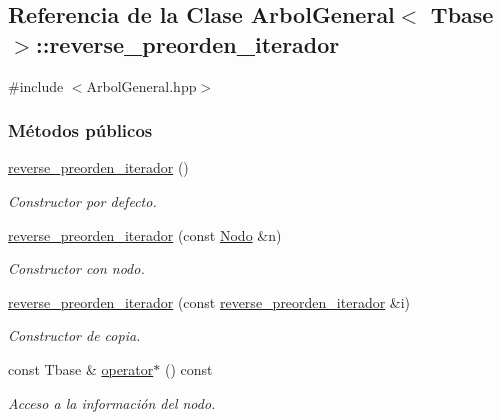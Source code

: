 \hypertarget{classArbolGeneral_1_1reverse__preorden__iterador}{\subsection{Referencia de la Clase Arbol\-General$<$ Tbase $>$\-:\-:reverse\-\_\-preorden\-\_\-iterador}
\label{classArbolGeneral_1_1reverse__preorden__iterador}
}


{\ttfamily \#include $<$Arbol\-General.\-hpp$>$}

\subsubsection*{Métodos públicos}
\begin{DoxyCompactItemize}
\item 
\hyperlink{classArbolGeneral_1_1reverse__preorden__iterador_a80a523317a7f93ef2359d16048d7bd7e}{reverse\-\_\-preorden\-\_\-iterador} ()
\begin{DoxyCompactList}\small\item\em Constructor por defecto. \end{DoxyCompactList}\item 
\hyperlink{classArbolGeneral_1_1reverse__preorden__iterador_aab2e21080ac46472a8a5a572c3b79ca9}{reverse\-\_\-preorden\-\_\-iterador} (const \hyperlink{classArbolGeneral_a12cc1b74a9095d89bc7334290d332f7a}{Nodo} \&n)
\begin{DoxyCompactList}\small\item\em Constructor con nodo. \end{DoxyCompactList}\item 
\hyperlink{classArbolGeneral_1_1reverse__preorden__iterador_a0fb07f7fb272f8257a912e1941d06f40}{reverse\-\_\-preorden\-\_\-iterador} (const \hyperlink{classArbolGeneral_1_1reverse__preorden__iterador}{reverse\-\_\-preorden\-\_\-iterador} \&i)
\begin{DoxyCompactList}\small\item\em Constructor de copia. \end{DoxyCompactList}\item 
const Tbase \& \hyperlink{classArbolGeneral_1_1reverse__preorden__iterador_a4c13adf7d51aa91f6ae7a8816baf204f}{operator$\ast$} () const 
\begin{DoxyCompactList}\small\item\em Acceso a la información del nodo. \end{DoxyCompactList}\item 

\end{DoxyCompactItemize}
